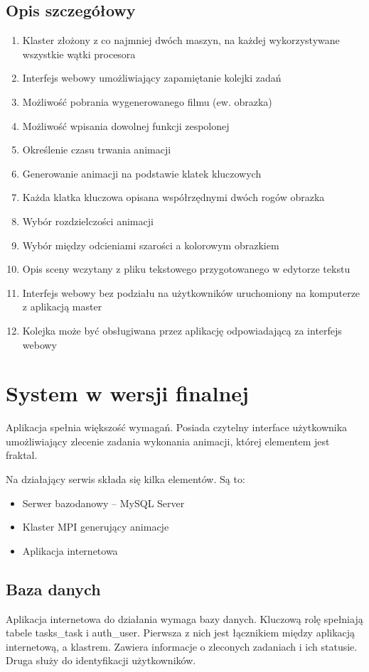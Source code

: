 \documentclass[a4paper]{article}
\begin{document}
\subsection{Opis szczegółowy}
\begin{enumerate}
\item Klaster złożony z co najmniej dwóch maszyn, na każdej wykorzystywane wszystkie wątki procesora
\item Interfejs webowy umożliwiający zapamiętanie kolejki zadań
\item Możliwość pobrania wygenerowanego filmu (ew. obrazka)
\item Możliwość wpisania dowolnej funkcji zespolonej
\item Określenie czasu trwania animacji
\item Generowanie animacji na podstawie klatek kluczowych
\item Każda klatka kluczowa opisana współrzędnymi dwóch rogów obrazka
\item Wybór rozdzielczości animacji
\item Wybór między odcieniami szarości a kolorowym obrazkiem
\item Opis sceny wczytany z pliku tekstowego przygotowanego  w edytorze tekstu
\item Interfejs webowy bez podziału na użytkowników uruchomiony na komputerze z aplikacją master
\item Kolejka może być obsługiwana przez aplikację odpowiadającą za interfejs webowy
\end{enumerate}
\newpage

\section{System w wersji finalnej}
Aplikacja spełnia większość wymagań. Posiada czytelny interface użytkownika umożliwiający zlecenie zadania wykonania animacji, której elementem jest fraktal. 
\par
Na działający serwis składa się kilka elementów. Są to:
\begin{itemize}
\item Serwer bazodanowy -- MySQL Server
\item Klaster MPI generujący animacje
\item Aplikacja internetowa
\end{itemize}

\subsection{Baza danych}
Aplikacja internetowa do działania wymaga bazy danych. Kluczową rolę spełniają tabele tasks\_task i auth\_user. Pierwsza z nich jest łącznikiem między aplikacją internetową, a klastrem. Zawiera informacje o zleconych zadaniach i ich statusie. Druga służy do identyfikacji użytkowników.
\end{document}
